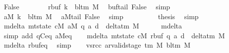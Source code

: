 \begin{isabellebody}
\ False\isanewline
\ \ \ \ \ \ \isamarkupfalse%
\ {\isachardoublequoteopen}{\isacharquery}{\kern0pt}rbuf\ k\ {\isacharequal}{\kern0pt}\ bl{\isacharunderscore}{\kern0pt}tm\ M{\isachardoublequoteclose}\ \isamarkupfalse%
\ buf{}{\isacharunderscore}{\kern0pt}tail\ False\ \isamarkupfalse%
\ simp\isanewline
\ \ \ \ \ \ \isamarkupfalse%
\ \isamarkupfalse%
\ {\isachardoublequoteopen}{\isacharquery}{\kern0pt}aM\ k\ {\isacharequal}{\kern0pt}\ bl{\isacharunderscore}{\kern0pt}tm\ M{\isachardoublequoteclose}\ \isamarkupfalse%
\ aM{\isacharunderscore}{\kern0pt}tail\ False\ \isamarkupfalse%
\ simp\isanewline
\ \ \ \ \ \ \isamarkupfalse%
\ \isamarkupfalse%
\ {\isacharquery}{\kern0pt}thesis\ \isamarkupfalse%
\ simp\isanewline
\ \ \ \ \isamarkupfalse%
\isanewline
\ \ \isamarkupfalse%
\isanewline
\ \ \isamarkupfalse%
\ mdelta{\isacharprime}{\kern0pt}{\isacharcolon}{\kern0pt}\ {\isachardoublequoteopen}{\isacharparenleft}{\kern0pt}mt{\isacharunderscore}{\kern0pt}state\ cM{\isacharcomma}{\kern0pt}\ {\isacharquery}{\kern0pt}aM{\isacharcomma}{\kern0pt}\ q{\isacharprime}{\kern0pt}{\isacharcomma}{\kern0pt}\ a{\isacharprime}{\kern0pt}{\isacharcomma}{\kern0pt}\ d{\isacharparenright}{\kern0pt}\ {\isasymin}\ delta{\isacharunderscore}{\kern0pt}tm\ M{\isachardoublequoteclose}\isanewline
\ \ \ \ \isamarkupfalse%
\ mdelta\ \isamarkupfalse%
\ {\isacharparenleft}{\kern0pt}simp\ add{\isacharcolon}{\kern0pt}\ qC{\isacharunderscore}{\kern0pt}eq\ aM{\isacharunderscore}{\kern0pt}eq{\isacharparenright}{\kern0pt}\isanewline
\ \ \isamarkupfalse%
\ mdelta{\isacharprime}{\kern0pt}{\isacharprime}{\kern0pt}{\isacharcolon}{\kern0pt}\ {\isachardoublequoteopen}{\isacharparenleft}{\kern0pt}mt{\isacharunderscore}{\kern0pt}state\ cM{\isacharcomma}{\kern0pt}\ {\isacharquery}{\kern0pt}rbuf{\isacharcomma}{\kern0pt}\ q{\isacharprime}{\kern0pt}{\isacharcomma}{\kern0pt}\ a{\isacharprime}{\kern0pt}{\isacharcomma}{\kern0pt}\ d{\isacharparenright}{\kern0pt}\ {\isasymin}\ delta{\isacharunderscore}{\kern0pt}tm\ M{\isachardoublequoteclose}\isanewline
\ \ \ \ \isamarkupfalse%
\ mdelta{\isacharprime}{\kern0pt}\ rbuf{\isacharunderscore}{\kern0pt}eq\ \isamarkupfalse%
\ simp\isanewline
\ \ \isamarkupfalse%
\ vsrc{\isacharunderscore}{\kern0pt}c{\isacharcolon}{\kern0pt}\ {\isachardoublequoteopen}ar{\isacharunderscore}{\kern0pt}valid{\isacharunderscore}{\kern0pt}stage\ {\isacharparenleft}{\kern0pt}{\isasymGamma}{\isacharunderscore}{\kern0pt}tm\ M{\isacharparenright}{\kern0pt}\ {\isacharparenleft}{\kern0pt}bl{\isacharunderscore}{\kern0pt}tm\ M{\isacharparenright}{\kern0pt}\isanewline

\end{isabellebody}
